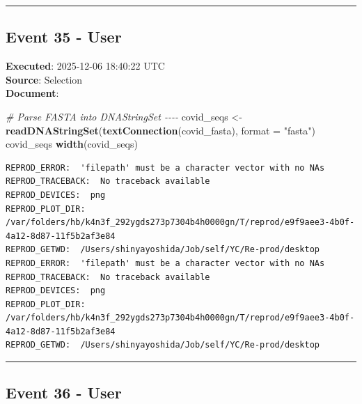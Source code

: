 \documentclass[
  11pt,
]{article}
\newenvironment{Shaded}{\begin{snugshade}}{\end{snugshade}}
\newcommand{\AttributeTok}[1]{\textcolor[rgb]{0.13,0.29,0.53}{#1}}
\newcommand{\CommentTok}[1]{\textcolor[rgb]{0.56,0.35,0.01}{\textit{#1}}}
\newcommand{\FunctionTok}[1]{\textcolor[rgb]{0.13,0.29,0.53}{\textbf{#1}}}
\newcommand{\NormalTok}[1]{#1}
\newcommand{\OtherTok}[1]{\textcolor[rgb]{0.56,0.35,0.01}{#1}}
\newcommand{\StringTok}[1]{\textcolor[rgb]{0.31,0.60,0.02}{#1}}
\newenvironment{rpoutput}{\vspace{0.5em}\begin{snugshade}}{\end{snugshade}}
\begin{document}
\begin{center}\rule{0.5\linewidth}{0.5pt}\end{center}

\subsection{Event 35 - User}\label{event-35---user}

\textbf{Executed}: 2025-12-06 18:40:22 UTC\\
\textbf{Source}: Selection\\
\textbf{Document}:

\begin{Shaded}
\begin{Highlighting}[]
\CommentTok{\# Parse FASTA into DNAStringSet {-}{-}{-}{-}}
\NormalTok{covid\_seqs }\OtherTok{\textless{}{-}} \FunctionTok{readDNAStringSet}\NormalTok{(}\FunctionTok{textConnection}\NormalTok{(covid\_fasta), }\AttributeTok{format =} \StringTok{"fasta"}\NormalTok{)}
\NormalTok{covid\_seqs}
\FunctionTok{width}\NormalTok{(covid\_seqs)}
\end{Highlighting}
\end{Shaded}

\begin{rpoutput}

\begin{verbatim}
REPROD_ERROR:  'filepath' must be a character vector with no NAs 
REPROD_TRACEBACK:  No traceback available  
REPROD_DEVICES:  png 
REPROD_PLOT_DIR:  /var/folders/hb/k4n3f_292ygds273p7304b4h0000gn/T/reprod/e9f9aee3-4b0f-4a12-8d87-11f5b2af3e84 
REPROD_GETWD:  /Users/shinyayoshida/Job/self/YC/Re-prod/desktop 
REPROD_ERROR:  'filepath' must be a character vector with no NAs 
REPROD_TRACEBACK:  No traceback available  
REPROD_DEVICES:  png 
REPROD_PLOT_DIR:  /var/folders/hb/k4n3f_292ygds273p7304b4h0000gn/T/reprod/e9f9aee3-4b0f-4a12-8d87-11f5b2af3e84 
REPROD_GETWD:  /Users/shinyayoshida/Job/self/YC/Re-prod/desktop 
\end{verbatim}

\end{rpoutput}

\begin{center}\rule{0.5\linewidth}{0.5pt}\end{center}

\subsection{Event 36 - User}\label{event-36---user}
\end{document}
